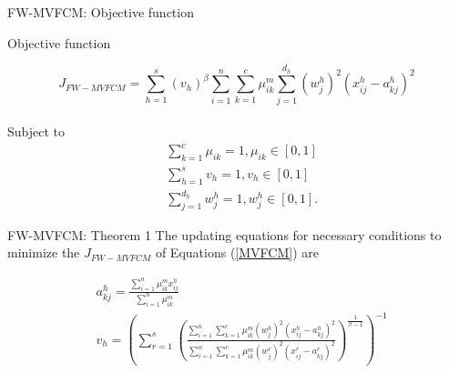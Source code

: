 \documentclass[compress,sky blue]{beamer}
\begin{document}
\begin{frame}{FW-MVFCM: Objective function}
	\vspace{-0.3cm}	
    
        Objective function 

	\begin{equation}
          \scriptstyle  J_{FW-MVFCM}  = \sum_{h=1}^{s} (v_{h})^{\beta}\sum_{i=1}^{n}\sum_{k=1}^{c} \mu_{ik}^{m} \sum_{j=1}^{d_{h}} (w_j^{h})^2 \left(x_{ij}^{h}-a_{kj}^{h}\right)^2
            \label{MVFCM} %
        \end{equation}
\\Subject to
         \begin{equation}
\begin{aligned}
{} & \scriptstyle\sum_{k=1}^{c}\mu_{ik}=1, \mu_{ik}\in[0,1]\\
      & \scriptstyle\sum_{h=1}^{s}v_{h}=1, v_{h}\in[0,1]\\
      & \scriptstyle\sum_{j=1}^{d_h} w_j^{h}= 1, w_j^{h}\in[0,1].
\end{aligned}
\label{constraint1}
\end{equation}
        

\end{frame}



\begin{frame}{FW-MVFCM: Theorem 1}
	\vspace{-0.3cm}	
The updating equations for necessary conditions to minimize the $J_{FW-MVFCM}$  of Equations (\ref{MVFCM}) are 

\begin{align}
   &a_{kj}^{h}  = \frac{\sum_{i=1}^{n}\mu_{ik}^{m}x_{ij}^{h}} {\sum_{i=1}^{n}\mu_{ik}^{m}} \label{UpdatingA}  \\
  &v_{h}  =\left(\sum_{r=1}^{s}\left(\frac{\sum_{i=1}^{n}\sum_{k=1}^{c}  \mu_{ik}^{m} (w_j^{h})^2  \left(x_{ij}^{h}-a_{kj}^{h}\right)^2} {\sum_{i=1}^{n}\sum_{k=1}^{c}  \mu_{ik}^{m} (w_j^{r})^2  \left(x_{ij}^{r}-a_{kj}^{r}\right)^2} \right)^\frac{1}{\beta-1} \right)^{-1}
  \label{UpdatingV} 
\end{align}
\end{frame}

\end{document}

